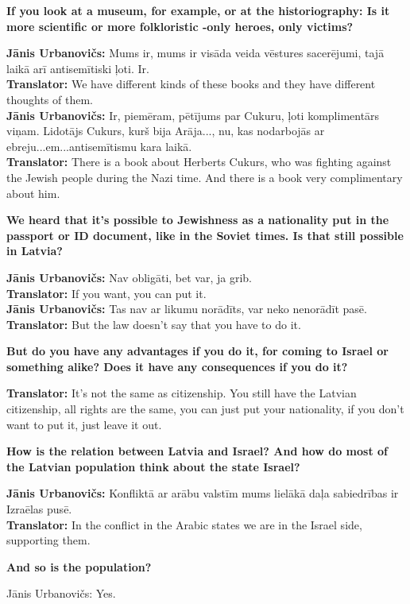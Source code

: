 \textbf{If you look at a museum, for example, or at the historiography: Is it more scientific or more folkloristic -only heroes, only victims?}  

\textbf{Jānis Urbanovičs:} Mums ir, mums ir visāda veida vēstures sacerējumi, tajā laikā arī antisemītiski ļoti. Ir.\\ 
\textbf{Translator:} We have different kinds of these books and they have different thoughts of them. \\
\textbf{Jānis Urbanovičs:} Ir, piemēram, pētījums par Cukuru, ļoti komplimentārs viņam. Lidotājs Cukurs, kurš bija Arāja..., nu, kas nodarbojās ar ebreju...em...antisemītismu kara laikā.\\  
\textbf{Translator:} There is a book about Herberts Cukurs, who was fighting against the Jewish people during the Nazi time. And there is a book very complimentary about him. 

\textbf{We heard that it's possible to Jewishness as a nationality put in the passport or ID document, like in the Soviet times. Is that still possible in Latvia?}  

\textbf{Jānis Urbanovičs:} Nav obligāti, bet var, ja grib.\\
\textbf{Translator:} If you want, you can put it.\\ 
\textbf{Jānis Urbanovičs:} Tas nav ar likumu norādīts, var neko nenorādīt pasē.\\ 
\textbf{Translator:} But the law doesn't say that you have to do it.  

\textbf{But do you have any advantages if you do it, for coming to Israel or something alike? Does it have any consequences if you do it?}  

\textbf{Translator:} It’s not the same as citizenship. You still have the Latvian citizenship, all rights are the same, you can just put your nationality, if you don't want to put it, just leave it out.  

\textbf{How is the relation between Latvia and Israel? And how do most of the Latvian population think about the state Israel?} 

\textbf{Jānis Urbanovičs:} Konfliktā ar arābu valstīm mums lielākā daļa sabiedrības ir Izraēlas pusē.\\
\textbf{Translator:} In the conflict in the Arabic states we are in the Israel side, supporting them.  

\textbf{And so is the population?} 

Jānis Urbanovičs: Yes. 

